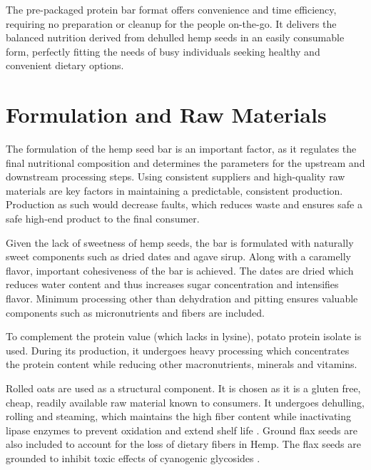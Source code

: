 \vspace{1em}
The pre-packaged protein bar format offers convenience and time efficiency, requiring no preparation or cleanup for the people on-the-go. It delivers the balanced nutrition derived from dehulled hemp seeds in an easily consumable form, perfectly fitting the needs of busy individuals seeking healthy and convenient dietary options.

\section{Formulation and Raw Materials}
The formulation of the hemp seed bar is an important factor, as it regulates the final nutritional composition and determines the parameters for the upstream and downstream processing steps. Using consistent suppliers and high-quality raw materials are key factors in maintaining a predictable, consistent production. Production as such would decrease faults, which reduces waste and ensures safe a safe high-end product to the final consumer. 

\vspace{1em}
Given the lack of sweetness of hemp seeds, the bar is formulated with naturally sweet components such as dried dates and agave sirup. Along with a caramelly flavor, important cohesiveness of the bar is achieved. The dates are dried which reduces water content and thus increases sugar concentration and intensifies flavor. Minimum processing other than dehydration and pitting ensures valuable components such as micronutrients and fibers are included.

\vspace{1em}
To complement the protein value (which lacks in lysine), potato protein isolate is used. During its production, it undergoes heavy processing which concentrates the protein content while reducing other macronutrients, minerals and vitamins\cite*{van2001effects}.

\vspace{1em}
Rolled oats are used as a structural component. It is chosen as it is a gluten free, cheap, readily available raw material known to consumers. It undergoes dehulling, rolling and steaming, which maintains the high fiber content while inactivating lipase enzymes to prevent oxidation and extend shelf life \cite*{Ekelund2024OatKilning}. Ground flax seeds are also included to account for the loss of dietary fibers in Hemp. The flax seeds are grounded to inhibit toxic effects of cyanogenic glycosides \cite*{Nowak2023FlaxseedHealth}.


